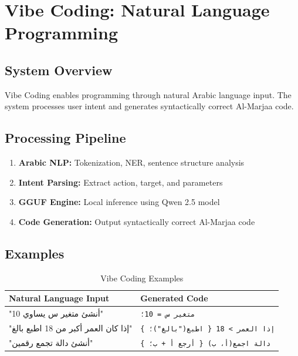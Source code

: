 \documentclass[11pt,a4paper]{article}
\begin{document}
\section{Vibe Coding: Natural Language Programming}
\label{sec:vibe}

\subsection{System Overview}

Vibe Coding enables programming through natural Arabic language input. The system processes user intent and generates syntactically correct Al-Marjaa code.

\subsection{Processing Pipeline}

\begin{enumerate}
    \item \textbf{Arabic NLP:} Tokenization, NER, sentence structure analysis
    \item \textbf{Intent Parsing:} Extract action, target, and parameters
    \item \textbf{GGUF Engine:} Local inference using Qwen 2.5 model
    \item \textbf{Code Generation:} Output syntactically correct Al-Marjaa code
\end{enumerate}

\subsection{Examples}

\begin{table}[h]
\centering
\caption{Vibe Coding Examples}
\label{tab:vibe-examples}
\begin{tabular}{@{}p{5cm}p{6cm}@{}}
\toprule
\textbf{Natural Language Input} & \textbf{Generated Code} \\
\midrule
\textarabic{"أنشئ متغير س يساوي 10"} & \texttt{متغير س = 10؛} \\
\textarabic{"إذا كان العمر أكبر من 18 اطبع بالغ"} & \texttt{إذا العمر > 18 \{ اطبع("بالغ")؛ \}} \\
\textarabic{"أنشئ دالة تجمع رقمين"} & \texttt{دالة اجمع(أ، ب) \{ أرجع أ + ب؛ \}} \\
\bottomrule
\end{tabular}
\end{table}
\end{document}
